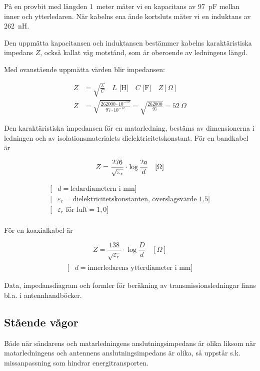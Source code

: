 På en provbit med längden 1~meter mäter vi en kapacitans av 97~pF
mellan inner och ytterledaren. När kabelns ena ände kortsluts mäter vi
en induktans av 262~nH.

Den uppmätta kapacitansen och induktansen bestämmer kabelns
karaktäristiska impedans \(Z\), också kallat våg motstånd, som är
oberoende av ledningens längd.

Med ovanstående uppmätta värden blir impedansen:

\begin{align*}
  Z &= \sqrt{\frac{L}{C}} \quad L\text{ [H]} \quad C\text{ [F]} \quad
  Z[\Omega] \\
  Z &= \sqrt{\frac{262000\cdot 10^{-12}}{97\cdot 10^{-12}}} =
  \sqrt{\frac{262000}{97}} = 52\ \Omega
\end{align*}

Den karaktäristiska impedansen för en matarledning, bestäms av
dimensionerna i ledningen och av isolationsmaterialets
dielektricitetskonstant. För en bandkabel är

\[
Z = \frac{276}{\sqrt{\varepsilon_r}}\cdot\log\frac{2a}{d} \quad [\Omega] \\
\]
\begin{align*}
[&a = \text{centrumavståndet mellan ledarna i mm}] \\
[&d = \text{ledardiametern i mm}] \\
[&\varepsilon_r = \text{dielektricitetskonstanten, överslagsvärde 1,5}] \\
[&\varepsilon_r \text{ för luft} = 1,0] \\
\end{align*}

För en koaxialkabel är

\[
Z = \frac{138}{\sqrt{\varepsilon_r}}\cdot\log\frac{D}{d} \quad [\Omega]
\]
\begin{align*}
[&D = \text{ytterledarens innerdiameter i mm}] \\
[&d = \text{innerledarens ytterdiameter i mm}]
\end{align*}

Data, impedansdiagram och formler för beräkning av
transmissionsledningar finns bl.a. i antennhandböcker.

\subsection{Stående vågor}

Både när sändarens och matarledningens anslutningsimpedans är olika
liksom när matarledningens och antennens anslutningsimpedans är olika,
så uppstår s.k. missanpassning som hindrar energitransporten.

